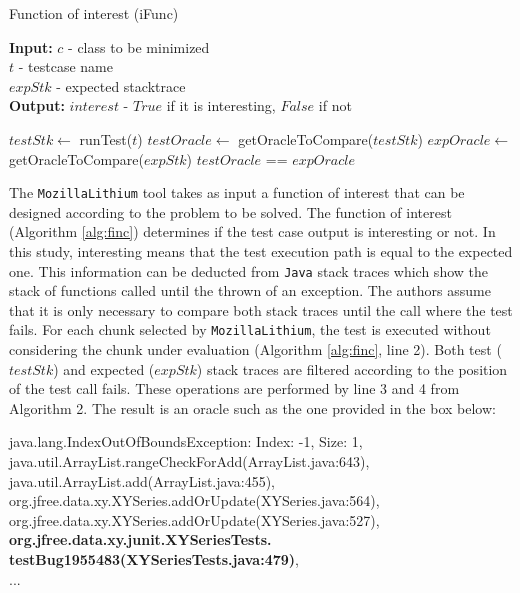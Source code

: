 \documentclass[sigplan,10pt,review,anonymous]{acmart}\settopmatter{printfolios=true,printccs=false,printacmref=false}
\begin{document}
\begin{algorithm}[h]
	\caption{Function of interest (iFunc)}
	\label{alg:finc}
	\begin{flushleft}
		\textbf{Input:} $c$ - class to be minimized\\
		\hspace{2.75em} $t$ - testcase name\\
		\hspace{2.75em} $expStk$ -  expected stacktrace\\
		\textbf{Output:} $interest$ - $True$ if it is interesting, $False$ if not \\
	\end{flushleft}
	\begin{algorithmic}[1]
		\State $testStk \leftarrow$ runTest($t$)
		\State $testOracle \leftarrow$ getOracleToCompare($testStk$)
		\State $expOracle \leftarrow$ getOracleToCompare($expStk$)
		\State \Return $testOracle$ == $expOracle$
		\EndFunction

	\end{algorithmic}

\end{algorithm}

The \texttt{MozillaLithium} tool takes as input a function of interest that can be designed according to the problem to be solved. The function of interest (Algorithm \ref{alg:finc}) determines if the test case output is interesting or not. In this study, interesting means that the test execution path is equal to the expected one. This information can be deducted from \texttt{Java} stack traces which show the stack of functions called until the thrown of an exception. The authors assume that it is only necessary to compare both stack traces until the call where the test fails. For each chunk selected by \texttt{MozillaLithium}, the test is executed without considering the chunk under evaluation (Algorithm \ref{alg:finc}, line 2). Both test ($testStk$) and expected ($expStk$) stack traces are filtered according to the position of the test call fails. These operations are performed by line 3 and 4 from Algorithm 2. The result is an oracle such as the one provided in the box below:


\vspace{3mm}
\begin{myframe} \label{box:1}
java.lang.IndexOutOfBoundsException: Index: -1, Size: 1,
java.util.ArrayList.rangeCheckForAdd(ArrayList.java:643),
java.util.ArrayList.add(ArrayList.java:455),
org.jfree.data.xy.XYSeries.addOrUpdate(XYSeries.java:564),
org.jfree.data.xy.XYSeries.addOrUpdate(XYSeries.java:527),
\textbf{org.jfree.data.xy.junit.XYSeriesTests.}\\
\textbf{testBug1955483(XYSeriesTests.java:479)},\\
...
\end{myframe}
\end{document}

